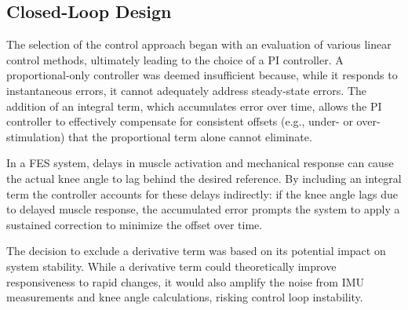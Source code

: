 \subsection{Closed-Loop Design}
The selection of the control approach began with an evaluation of various linear control methods, ultimately leading to the choice of a PI controller. A proportional-only controller was deemed insufficient because, while it responds to instantaneous errors, it cannot adequately address steady-state errors. The addition of an integral term, which accumulates error over time, allows the PI controller to effectively compensate for consistent offsets (e.g., under- or over-stimulation) that the proportional term alone cannot eliminate.

In a FES system, delays in muscle activation and mechanical response can cause the actual knee angle to lag behind the desired reference. By including an integral term the controller accounts for these delays indirectly: if the knee angle lags due to delayed muscle response, the accumulated error prompts the system to apply a sustained correction to minimize the offset over time.

The decision to exclude a derivative term was based on its potential impact on system stability. While a derivative term could theoretically improve responsiveness to rapid changes, it would also amplify the noise from IMU measurements and knee angle calculations, risking control loop instability.

